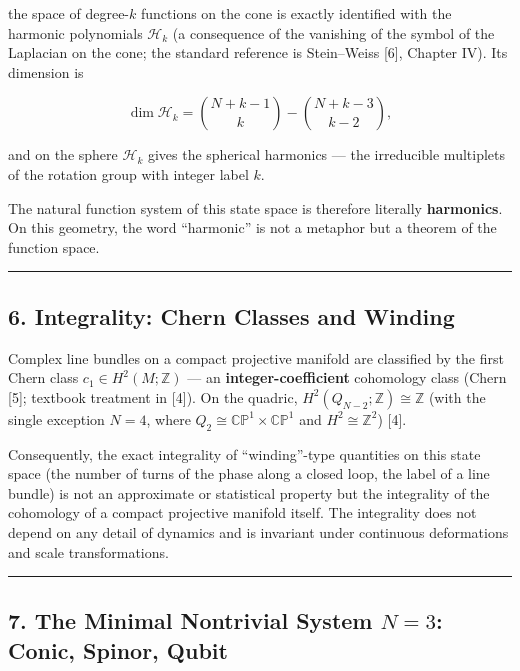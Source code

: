 \documentclass[
  a4paper,
]{article}
\begin{document}
the space of degree-\(k\) functions on the cone is exactly identified
with the harmonic polynomials \(\mathcal H_k\) (a consequence of the
vanishing of the symbol of the Laplacian on the cone; the standard
reference is Stein--Weiss {[}6{]}, Chapter IV). Its dimension is

\[
\dim\mathcal H_k=\binom{N+k-1}{k}-\binom{N+k-3}{k-2},
\]

and on the sphere \(\mathcal H_k\) gives the spherical harmonics --- the
irreducible multiplets of the rotation group with integer label \(k\).

The natural function system of this state space is therefore literally
\textbf{harmonics}. On this geometry, the word ``harmonic'' is not a
metaphor but a theorem of the function space.

\begin{center}\rule{0.5\linewidth}{0.5pt}\end{center}

\subsection{6. Integrality: Chern Classes and
Winding}\label{integrality-chern-classes-and-winding}

Complex line bundles on a compact projective manifold are classified by
the first Chern class \(c_1\in H^2(M;\mathbb Z)\) --- an
\textbf{integer-coefficient} cohomology class (Chern {[}5{]}; textbook
treatment in {[}4{]}). On the quadric,
\(H^2(Q_{N-2};\mathbb Z)\cong\mathbb Z\) (with the single exception
\(N=4\), where \(Q_2\cong\mathbb{CP}^1\times\mathbb{CP}^1\) and
\(H^2\cong\mathbb Z^2\)) {[}4{]}.

Consequently, the exact integrality of ``winding''-type quantities on
this state space (the number of turns of the phase along a closed loop,
the label of a line bundle) is not an approximate or statistical
property but the integrality of the cohomology of a compact projective
manifold itself. The integrality does not depend on any detail of
dynamics and is invariant under continuous deformations and scale
transformations.

\begin{center}\rule{0.5\linewidth}{0.5pt}\end{center}

\subsection{\texorpdfstring{7. The Minimal Nontrivial System \(N=3\):
Conic, Spinor,
Qubit}{7. The Minimal Nontrivial System N=3: Conic, Spinor, Qubit}}\label{the-minimal-nontrivial-system-n3-conic-spinor-qubit}
\end{document}
